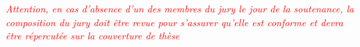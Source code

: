 \maketitle

{\vspace{0.5cm}
\begin{spacing}{1}
 \fontsize{9.5}{11}\selectfont \textcolor{red}{ 
\textit{Attention, en cas d’absence d’un des membres du jury le jour de la soutenance,
la composition du jury doit être revue pour s’assurer qu’elle est conforme et devra
{\^e}tre r{\'e}percut{\'e}e sur la couverture de th{\`e}se}}
\end{spacing}
}\par


\restoregeometry
